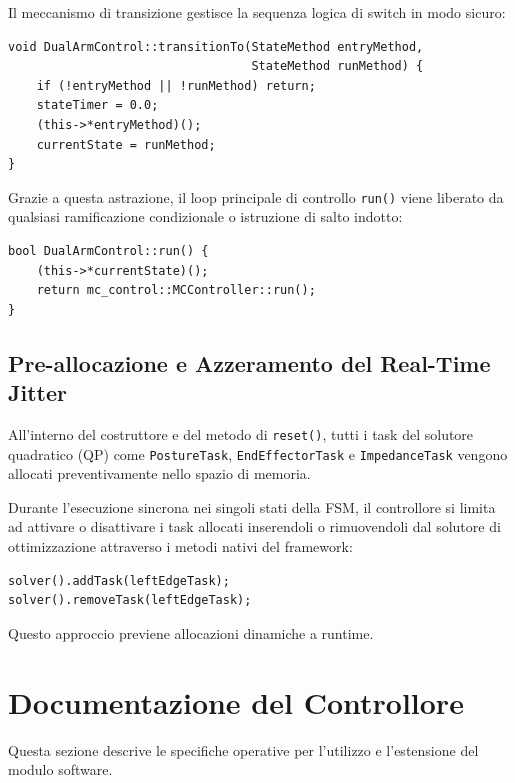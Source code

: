 \documentclass[11pt,a4paper]{article}
\begin{document}
Il meccanismo di transizione gestisce la sequenza logica di switch in modo sicuro:

\begin{lstlisting}
void DualArmControl::transitionTo(StateMethod entryMethod, 
                                  StateMethod runMethod) {
    if (!entryMethod || !runMethod) return;
    stateTimer = 0.0; 
    (this->*entryMethod)(); 
    currentState = runMethod; 
}
\end{lstlisting}

Grazie a questa astrazione, il loop principale di controllo \texttt{run()} viene liberato da qualsiasi ramificazione condizionale o istruzione di salto indotto:

\begin{lstlisting}
bool DualArmControl::run() {
    (this->*currentState)(); 
    return mc_control::MCController::run();
}
\end{lstlisting}

\subsection{Pre-allocazione e Azzeramento del Real-Time Jitter}
All'interno del costruttore e del metodo di \texttt{reset()}, tutti i task del solutore quadratico (QP) come \texttt{PostureTask}, \texttt{EndEffectorTask} e \texttt{ImpedanceTask} vengono allocati preventivamente nello spazio di memoria. 

Durante l'esecuzione sincrona nei singoli stati della FSM, il controllore si limita ad attivare o disattivare i task allocati inserendoli o rimuovendoli dal solutore di ottimizzazione attraverso i metodi nativi del framework:
\begin{lstlisting}
solver().addTask(leftEdgeTask);
solver().removeTask(leftEdgeTask);
\end{lstlisting}
Questo approccio previene allocazioni dinamiche a runtime.



\section{Documentazione del Controllore}
Questa sezione descrive le specifiche operative per l'utilizzo e l'estensione del modulo software.
\end{document}
